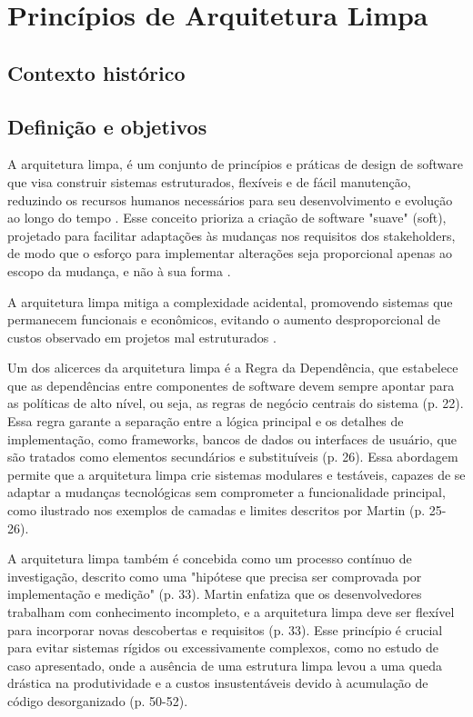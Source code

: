 \section{Princípios de Arquitetura Limpa}
    \subsection{Contexto histórico}
    
    \subsection{Definição e objetivos}
        \par A arquitetura limpa, é um conjunto de princípios e práticas de design de software que visa construir sistemas estruturados, flexíveis e de fácil manutenção, reduzindo os recursos humanos necessários para seu desenvolvimento e evolução ao longo do tempo \cite{livro:martin:cleanarch}. Esse conceito prioriza a criação de software "suave" (soft), projetado para facilitar adaptações às mudanças nos requisitos dos stakeholders, de modo que o esforço para implementar alterações seja proporcional apenas ao escopo da mudança, e não à sua forma \cite{livro:martin:cleanarch}.
  
        \par A arquitetura limpa mitiga a complexidade acidental, promovendo sistemas que permanecem funcionais e econômicos, evitando o aumento desproporcional de custos observado em projetos mal estruturados \cite{livro:martin:cleanarch}.

    
        \par Um dos alicerces da arquitetura limpa é a Regra da Dependência, que estabelece que as dependências entre componentes de software devem sempre apontar para as políticas de alto nível, ou seja, as regras de negócio centrais do sistema (p. 22). Essa regra garante a separação entre a lógica principal e os detalhes de implementação, como frameworks, bancos de dados ou interfaces de usuário, que são tratados como elementos secundários e substituíveis (p. 26). Essa abordagem permite que a arquitetura limpa crie sistemas modulares e testáveis, capazes de se adaptar a mudanças tecnológicas sem comprometer a funcionalidade principal, como ilustrado nos exemplos de camadas e limites descritos por Martin (p. 25-26).

        \par A arquitetura limpa também é concebida como um processo contínuo de investigação, descrito como uma "hipótese que precisa ser comprovada por implementação e medição" (p. 33). Martin enfatiza que os desenvolvedores trabalham com conhecimento incompleto, e a arquitetura limpa deve ser flexível para incorporar novas descobertas e requisitos (p. 33). Esse princípio é crucial para evitar sistemas rígidos ou excessivamente complexos, como no estudo de caso apresentado, onde a ausência de uma estrutura limpa levou a uma queda drástica na produtividade e a custos insustentáveis devido à acumulação de código desorganizado (p. 50-52).

